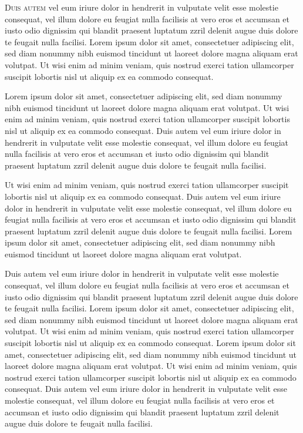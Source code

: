 \documentclass[oldfontcommands,6x9]{pupbook}
\begin{document}
\begin{thepreface}
\textsc{Duis autem} vel eum iriure dolor in hendrerit in vulputate velit esse
molestie consequat, vel illum dolore eu feugiat nulla facilisis at vero
eros et accumsan et iusto odio dignissim qui blandit praesent luptatum
zzril delenit augue duis dolore te feugait nulla facilisi. Lorem ipsum
dolor sit amet, consectetuer adipiscing elit, sed diam nonummy nibh
euismod tincidunt ut laoreet dolore magna aliquam erat volutpat. Ut wisi
enim ad minim veniam, quis nostrud exerci tation ullamcorper suscipit
lobortis nisl ut aliquip ex ea commodo consequat. 

Lorem ipsum dolor sit amet, consectetuer adipiscing elit, sed diam
nonummy nibh euismod tincidunt ut laoreet dolore magna aliquam erat
volutpat. Ut wisi enim ad minim veniam, quis nostrud exerci tation
ullamcorper suscipit lobortis nisl ut aliquip ex ea commodo consequat.
Duis autem vel eum iriure dolor in hendrerit in vulputate velit esse
molestie consequat, vel illum dolore eu feugiat nulla facilisis at vero
eros et accumsan et iusto odio dignissim qui blandit praesent luptatum
zzril delenit augue duis dolore te feugait nulla facilisi. 

Ut wisi enim ad minim veniam, quis nostrud exerci tation ullamcorper
suscipit lobortis nisl ut aliquip ex ea commodo consequat. Duis autem
vel eum iriure dolor in hendrerit in vulputate velit esse molestie
consequat, vel illum dolore eu feugiat nulla facilisis at vero eros et
accumsan et iusto odio dignissim qui blandit praesent luptatum zzril
delenit augue duis dolore te feugait nulla facilisi. Lorem ipsum dolor
sit amet, consectetuer adipiscing elit, sed diam nonummy nibh euismod
tincidunt ut laoreet dolore magna aliquam erat volutpat. 

Duis autem vel eum iriure dolor in hendrerit in vulputate velit esse
molestie consequat, vel illum dolore eu feugiat nulla facilisis at vero
eros et accumsan et iusto odio dignissim qui blandit praesent luptatum
zzril delenit augue duis dolore te feugait nulla facilisi. Lorem ipsum
dolor sit amet, consectetuer adipiscing elit, sed diam nonummy nibh
euismod tincidunt ut laoreet dolore magna aliquam erat volutpat. Ut wisi
enim ad minim veniam, quis nostrud exerci tation ullamcorper suscipit
lobortis nisl ut aliquip ex ea commodo consequat. 
Lorem ipsum dolor sit amet, consectetuer adipiscing elit, sed diam
nonummy nibh euismod tincidunt ut laoreet dolore magna aliquam erat
volutpat. Ut wisi enim ad minim veniam, quis nostrud exerci tation
ullamcorper suscipit lobortis nisl ut aliquip ex ea commodo consequat.
Duis autem vel eum iriure dolor in hendrerit in vulputate velit esse
molestie consequat, vel illum dolore eu feugiat nulla facilisis at vero
eros et accumsan et iusto odio dignissim qui blandit praesent luptatum
zzril delenit augue duis dolore te feugait nulla facilisi. 


\end{thepreface}
\end{document}
